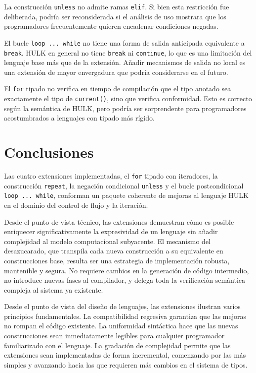 \documentclass[12pt, a4paper]{article}
\begin{document}
La construcción \texttt{unless} no admite ramas \texttt{elif}. Si bien esta restricción fue deliberada, podría ser reconsiderada si el análisis de uso mostrara que los programadores frecuentemente quieren encadenar condiciones negadas.

El bucle \texttt{loop~...~while} no tiene una forma de salida anticipada equivalente a \texttt{break}. HULK en general no tiene \texttt{break} ni \texttt{continue}, lo que es una limitación del lenguaje base más que de la extensión. Añadir mecanismos de salida no local es una extensión de mayor envergadura que podría considerarse en el futuro.

El \texttt{for} tipado no verifica en tiempo de compilación que el tipo anotado sea exactamente el tipo de \texttt{current()}, sino que verifica conformidad. Esto es correcto según la semántica de HULK, pero podría ser sorprendente para programadores acostumbrados a lenguajes con tipado más rígido.

\section{Conclusiones}

Las cuatro extensiones implementadas, el \texttt{for} tipado con iteradores, la construcción \texttt{repeat}, la negación condicional \texttt{unless} y el bucle postcondicional \texttt{loop~...~while}, conforman un paquete coherente de mejoras al lenguaje HULK en el dominio del control de flujo y la iteración.

Desde el punto de vista técnico, las extensiones demuestran cómo es posible enriquecer significativamente la expresividad de un lenguaje sin añadir complejidad al modelo computacional subyacente. El mecanismo del desazucarado, que transpila cada nueva construcción a su equivalente en construcciones base, resulta ser una estrategia de implementación robusta, mantenible y segura. No requiere cambios en la generación de código intermedio, no introduce nuevas fases al compilador, y delega toda la verificación semántica compleja al sistema ya existente.

Desde el punto de vista del diseño de lenguajes, las extensiones ilustran varios principios fundamentales. La compatibilidad regresiva garantiza que las mejoras no rompan el código existente. La uniformidad sintáctica hace que las nuevas construcciones sean inmediatamente legibles para cualquier programador familiarizado con el lenguaje. La gradación de complejidad permite que las extensiones sean implementadas de forma incremental, comenzando por las más simples y avanzando hacia las que requieren más cambios en el sistema de tipos.
\end{document}
